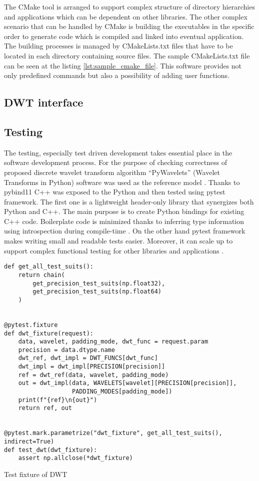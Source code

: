 The CMake tool is arranged to support complex structure of directory hierarchies and applications
which can be dependent on other libraries. The other complex scenario that can be handled by CMake
is building the executables in the specific order to generate code which is compiled and linked
into eventual application. The building processes is managed by CMakeLists.txt files that have
to be located in each directory containing source files. The sample CMakeLists.txt file can be
seen at the listing \ref{lst:sample_cmake_file}. This software provides not only predefined commands
but also a possibility of adding user functions.

\subsection{DWT interface}

\subsection{Testing}

The testing, especially test driven development takes essential place in the software development
process. For the purpose of checking correctness of proposed discrete wavelet transform algorithm
``PyWavelets'' (Wavelet Transforms in Python) software was used as the reference model \cite{pywavelets}.
Thanks to pybind11 \cite{pybind11} C++ was exposed to the Python and then tested using pytest framework.
The first one is a lightweight header-only library that synergizes both Python and C++. The main purpose
is to create Python bindings for existing C++ code. Boilerplate code is minimized thanks to inferring
type information using introspection during compile-time \cite{pywavelets}. On the other hand pytest framework makes
writing small and readable tests easier. Moreover, it can scale up to support complex functional
testing for other libraries and applications \cite{pytest}.

\begin{listing}[htb]
\begin{verbatim}
def get_all_test_suits():
    return chain(
        get_precision_test_suits(np.float32),
        get_precision_test_suits(np.float64)
    )


@pytest.fixture
def dwt_fixture(request):
    data, wavelet, padding_mode, dwt_func = request.param
    precision = data.dtype.name
    dwt_ref, dwt_impl = DWT_FUNCS[dwt_func]
    dwt_impl = dwt_impl[PRECISION[precision]]
    ref = dwt_ref(data, wavelet, padding_mode)
    out = dwt_impl(data, WAVELETS[wavelet][PRECISION[precision]],
                   PADDING_MODES[padding_mode])
    print(f"{ref}\n{out}")
    return ref, out


@pytest.mark.parametrize("dwt_fixture", get_all_test_suits(), indirect=True)
def test_dwt(dwt_fixture):
    assert np.allclose(*dwt_fixture)
\end{verbatim}
\caption{Test fixture of DWT}
\label{lst:dwt_test_fixture}
\end{listing}

